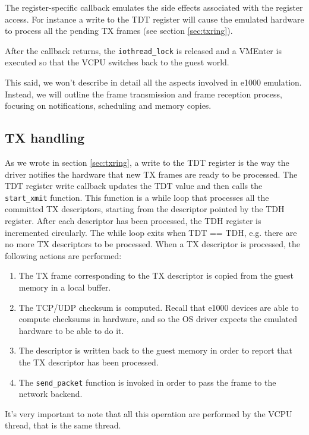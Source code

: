 The register-specific callback emulates the side effects associated with the register access. For instance a write to the TDT
register will cause the emulated hardware to process all the pending TX frames (see section \ref{sec:txring}).

After the callback returns, the \texttt{iothread\_lock} is released and a VMEnter is executed so that the VCPU switches back to the 
guest world.

\vspace{0.5cm}

This said, we won't describe in detail all the aspects involved in e1000 emulation. Instead, we will outline the frame
transmission and frame reception process, focusing on notifications, scheduling and memory copies.

\subsection{TX handling}
As we wrote in section \ref{sec:txring}, a write to the TDT register is the way the driver notifies the hardware that new TX frames 
are ready to be processed.
The TDT register write callback updates the TDT value and then calls the \texttt{start\_xmit} function. This function is a while
loop that processes all the committed TX descriptors, starting from the descriptor pointed by the TDH register. After each
descriptor has been processed, the TDH register is incremented circularly. The while loop exits when TDT == TDH, e.g. there
are no more TX descriptors to be processed.
When a TX descriptor is processed, the following actions are performed:
\begin{enumerate}
    \item The TX frame corresponding to the TX descriptor is copied from the guest memory in a local buffer.
    \item The TCP/UDP checksum is computed. Recall that e1000 devices are able to compute checksums in hardware, and so the OS 
	  driver expects the emulated hardware to be able to do it.
    \item The descriptor is written back to the guest memory in order to report that the TX descriptor has been processed.
    \item The \texttt{send\_packet} function is invoked in order to pass the frame to the network backend.
\end{enumerate}

It's very important to note that all this operation are performed by the VCPU thread, that is the same thread.